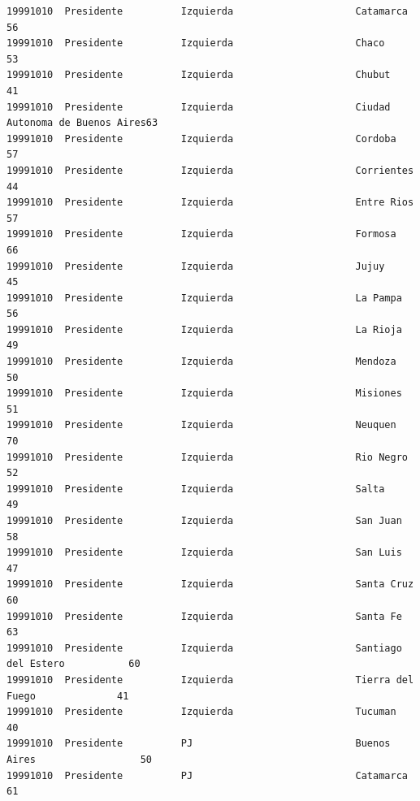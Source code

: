 \documentclass[a4paper,10pt]{article}
\begin{document}
\begin{verbatim}
19991010  Presidente          Izquierda                     Catamarca                     56             
19991010  Presidente          Izquierda                     Chaco                         53             
19991010  Presidente          Izquierda                     Chubut                        41             
19991010  Presidente          Izquierda                     Ciudad Autonoma de Buenos Aires63             
19991010  Presidente          Izquierda                     Cordoba                       57             
19991010  Presidente          Izquierda                     Corrientes                    44             
19991010  Presidente          Izquierda                     Entre Rios                    57             
19991010  Presidente          Izquierda                     Formosa                       66             
19991010  Presidente          Izquierda                     Jujuy                         45             
19991010  Presidente          Izquierda                     La Pampa                      56             
19991010  Presidente          Izquierda                     La Rioja                      49             
19991010  Presidente          Izquierda                     Mendoza                       50             
19991010  Presidente          Izquierda                     Misiones                      51             
19991010  Presidente          Izquierda                     Neuquen                       70             
19991010  Presidente          Izquierda                     Rio Negro                     52             
19991010  Presidente          Izquierda                     Salta                         49             
19991010  Presidente          Izquierda                     San Juan                      58             
19991010  Presidente          Izquierda                     San Luis                      47             
19991010  Presidente          Izquierda                     Santa Cruz                    60             
19991010  Presidente          Izquierda                     Santa Fe                      63             
19991010  Presidente          Izquierda                     Santiago del Estero           60             
19991010  Presidente          Izquierda                     Tierra del Fuego              41             
19991010  Presidente          Izquierda                     Tucuman                       40             
19991010  Presidente          PJ                            Buenos Aires                  50             
19991010  Presidente          PJ                            Catamarca                     61             

\end{verbatim}
\end{document}
